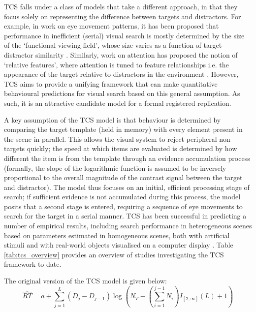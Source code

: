 \documentclass[preprint,12pt,authoryear]{elsarticle}
\begin{document}
TCS falls under a class of models that take a different approach, in that they focus solely on representing the difference between targets and distractors. For example, in work on eye movement patterns, it has been proposed that performance in inefficient (serial) visual search is mostly determined by the size of the `functional viewing field', whose size varies as a function of target-distractor similarity \citep{hulleman2017brink}. Similarly, work on attention has proposed the notion of `relative features', where attention is tuned to feature relationships i.e. the appearance of the target relative to distractors in the environment \citep{becker2014color, becker2010role}. However, TCS \citep{lleras2020target} aims to provide a unifying framework that can make quantitative behavioural predictions for visual search based on this general assumption. As such, it is an attractive candidate model for a formal registered replication.

A key assumption of the TCS model is that behaviour is determined by comparing the target template (held in memory) with every element present in the scene in parallel. This allows the visual system to reject peripheral non-targets quickly; the speed at which items are evaluated is determined by how different the item is from the template through an evidence accumulation process (formally, the slope of the logarithmic function is assumed to be inversely proportional to the overall magnitude of the contrast signal between the target and distractor). The model thus focuses on an initial, efficient processing stage of search; if sufficient evidence is not accumulated during this process, the model posits that a second stage is entered, requiring a sequence of eye movements to search for the target in a serial manner. TCS has been successful in predicting a number of empirical results, including search performance in heterogeneous scenes based on parameters estimated in homogeneous scenes, both with artificial stimuli \citep{buetti2016towards,lleras2019predicting} and with real-world objects visualised on a computer display \citep{wang2017predicting}. Table \ref{tab:tcs_overview} provides an overview of studies investigating the TCS framework to date.
 
The original version of the TCS model is given below:
\begin{equation}
\hat{RT} = a + \sum_{j=1}^{L}(D_j-D_{j-1})\log{\left( N_T-\left(\sum_{i=1}^{j-1}N_i\right)I_{[2,\infty]}(L)+1\right)}
\label{eq:tcs}
\end{equation}
\end{document}
